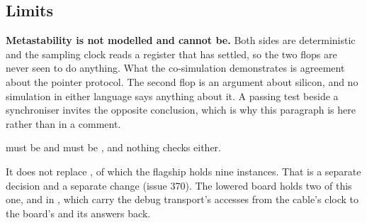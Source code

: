 \subsection*{Limits}

\textbf{Metastability is not modelled and cannot be.} Both sides are
deterministic and the sampling clock reads a register that has
settled, so the two flops are never seen to do anything. What the
co-simulation demonstrates is agreement about the pointer protocol.
The second flop is an argument about silicon, and no simulation in
either language says anything about it. A passing test beside a
synchroniser invites the opposite conclusion, which is why this
paragraph is here rather than in a comment.

 must be  and  must be ,
and nothing checks either.

It does not replace , of which the
flagship holds nine instances. That is a separate decision and a
separate change (issue 370). The lowered board holds two of this one,
 and  in , which
carry the debug transport's accesses from the cable's clock to the
board's and its answers back.

